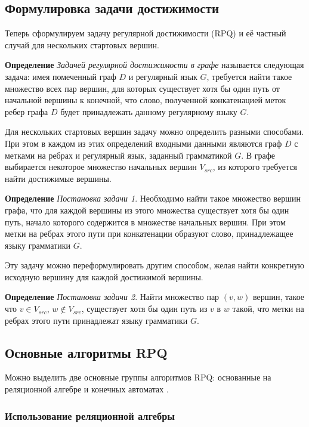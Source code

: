 \subsection{Формулировка задачи достижимости}\label{sec:3.3}

Теперь сформулируем задачу регулярной достижимости (RPQ) и её частный случай для нескольких стартовых вершин.

\noindent\textbf{Определение} \textit{Задачей регулярной достижимости в графе} называется следующая задача: имея помеченный граф $D$ и регулярный язык $G$, требуется найти такое множество всех пар вершин, для которых существует хотя бы один путь от начальной вершины к конечной, что слово, полученной конкатенацией меток ребер графа $D$ будет принадлежать данному регулярному языку $G$.

Для нескольких стартовых вершин задачу можно определить разными способами. При этом в каждом из этих определений входными данными являются граф $D$ с метками на ребрах и регулярный язык, заданный грамматикой $G$. В графе выбирается некоторое множество начальных вершин $V_{src}$, из которого требуется найти достижимые вершины.

\noindent\textbf{Определение}
\label{related_task1}\textit{Постановка задачи 1}. Необходимо найти такое множество вершин графа, что для каждой вершины из этого множества существует хотя бы один путь, начало которого содержится в множестве начальных вершин. При этом метки на ребрах этого пути при конкатенации образуют слово, принадлежащее языку грамматики $G$.

Эту задачу можно переформулировать другим способом, желая найти конкретную исходную вершину для каждой достижимой вершины.

\noindent\textbf{Определение}
\label{related_task2}\textit{Постановка задачи 2}. Найти множество пар $(v, w)$ вершин, такое что $v \in V_{src}$, $w \not\in V_{src}$, существует хотя бы один путь из $v$ в $w$ такой, что метки на ребрах этого пути принадлежат языку грамматики $G$.


\subsection{Основные алгоритмы RPQ}

Можно выделить две основные группы алгоритмов RPQ: основанные на реляционной алгебре и конечных автоматах \cite{related_rpq_book}.

\subsubsection{Использование реляционной алгебры}

